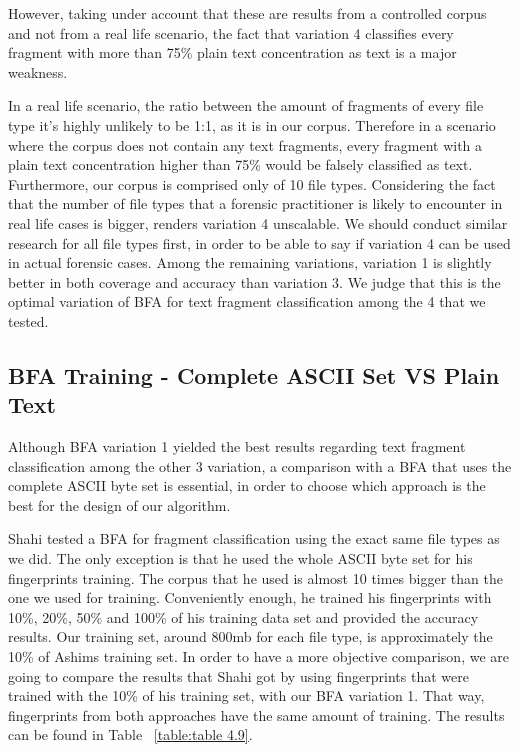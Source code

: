 However, taking under account that these are results from a controlled corpus and not from a real life scenario, the fact that variation 4 classifies every fragment with more than 75\% plain text concentration as text is a major weakness.

In a real life scenario, the ratio between the amount of fragments of every file type it's highly unlikely to be 1:1, as it is in our corpus. Therefore in a scenario where the corpus does not contain any text fragments, every fragment with a plain text concentration higher than 75\% would be falsely classified as text. Furthermore, our corpus is comprised only of 10 file types. Considering the fact that the number of file types that a forensic practitioner is likely to encounter in real life cases is bigger, renders variation 4 unscalable. We should conduct similar research for all file types first, in order to be able to say if variation 4 can be used in actual forensic cases. Among the remaining variations, variation 1 is slightly better in both coverage and accuracy than variation 3. We judge that this is the optimal variation of BFA for text fragment classification among the 4 that we tested.


\subsection{BFA Training - Complete ASCII Set VS Plain Text }
Although BFA variation 1 yielded the best results regarding text fragment classification among the other 3 variation, a comparison with a BFA that uses the complete ASCII byte set is essential, in order to choose which approach is the best for the design of our algorithm.

Shahi\cite{Ashim} tested a BFA for fragment classification using the exact same file types as we did. The only exception is that he used the whole ASCII byte set for his fingerprints training. The corpus that he used is almost 10 times bigger than the one we used for training. Conveniently enough, he trained his fingerprints with 10\%, 20\%, 50\% and 100\% of his training data set and provided the accuracy results. Our training set, around 800mb for each file type, is approximately the 10\% of Ashims training set. In order to have a more objective comparison, we are going to compare the results that Shahi got by using fingerprints that were trained with the 10\% of his training set, with our BFA variation 1. That way, fingerprints from both approaches have the same amount of training. The results can be found in Table ~\ref{table:table 4.9}.

